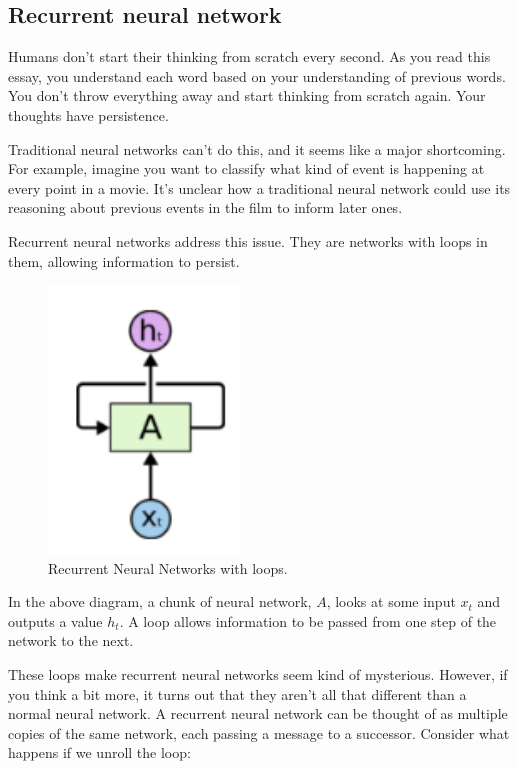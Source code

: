\subsection{Recurrent neural network}

Humans don’t start their thinking from scratch every second. As you read this essay, you understand each word based on your understanding of previous words. You don’t throw everything away and start thinking from scratch again. Your thoughts have persistence.

Traditional neural networks can’t do this, and it seems like a major shortcoming. For example, imagine you want to classify what kind of event is happening at every point in a movie. It’s unclear how a traditional neural network could use its reasoning about previous events in the film to inform later ones.

Recurrent neural networks address this issue. They are networks with loops in them, allowing information to persist.

\begin{figure}[H]
    \centering
    \includegraphics[width=2in]{images/rnn.png}
    \caption{Recurrent Neural Networks with loops.}
    \label{fig:rnnRoll}
\end{figure}

In the above diagram, a chunk of neural network, $A$, looks at some input $x_t$ and outputs a value $h_t$. A loop allows information to be passed from one step of the network to the next.

These loops make recurrent neural networks seem kind of mysterious. However, if you think a bit more, it turns out that they aren’t all that different than a normal neural network. A recurrent neural network can be thought of as multiple copies of the same network, each passing a message to a successor. Consider what happens if we unroll the loop:

